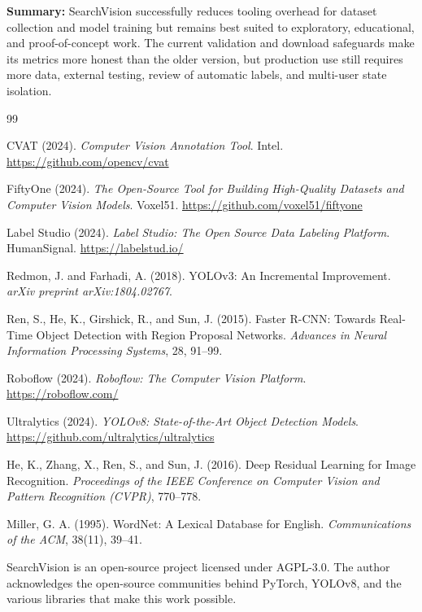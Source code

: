 \documentclass[12pt, letterpaper]{article}
\begin{document}
\textbf{Summary:} SearchVision successfully reduces tooling overhead for dataset collection and 
model training but remains best suited to exploratory, educational, and proof-of-concept
work. The current validation and download safeguards make its metrics more honest than the
older version, but production use still requires more data, external testing, review of
automatic labels, and multi-user state isolation.

\begingroup
{}
\small
\begin{thebibliography}{99}

CVAT (2024).
\textit{Computer Vision Annotation Tool}.
Intel. \url{https://github.com/opencv/cvat}

FiftyOne (2024).
\textit{The Open-Source Tool for Building High-Quality Datasets and Computer Vision Models}.
Voxel51. \url{https://github.com/voxel51/fiftyone}

Label Studio (2024).
\textit{Label Studio: The Open Source Data Labeling Platform}.
HumanSignal. \url{https://labelstud.io/}

Redmon, J. and Farhadi, A. (2018).
YOLOv3: An Incremental Improvement.
\textit{arXiv preprint arXiv:1804.02767}.

Ren, S., He, K., Girshick, R., and Sun, J. (2015).
Faster R-CNN: Towards Real-Time Object Detection with Region Proposal Networks.
\textit{Advances in Neural Information Processing Systems}, 28, 91--99.

Roboflow (2024).
\textit{Roboflow: The Computer Vision Platform}.
\url{https://roboflow.com/}

Ultralytics (2024).
\textit{YOLOv8: State-of-the-Art Object Detection Models}.
\url{https://github.com/ultralytics/ultralytics}

He, K., Zhang, X., Ren, S., and Sun, J. (2016).
Deep Residual Learning for Image Recognition.
\textit{Proceedings of the IEEE Conference on Computer Vision and Pattern Recognition (CVPR)},
770--778.

Miller, G. A. (1995).
WordNet: A Lexical Database for English.
\textit{Communications of the ACM}, 38(11), 39--41.

\end{thebibliography}
\endgroup

\bigskip
\noindent
\begin{tcolorbox}[colback=lightblue!20, colframe=accent, boxrule=0.5pt, arc=2pt,
                  title=Acknowledgements]
  SearchVision is an open-source project licensed under AGPL-3.0. The author acknowledges
  the open-source communities behind PyTorch, YOLOv8, and the various libraries that make
  this work possible.
\end{tcolorbox}
\end{document}
